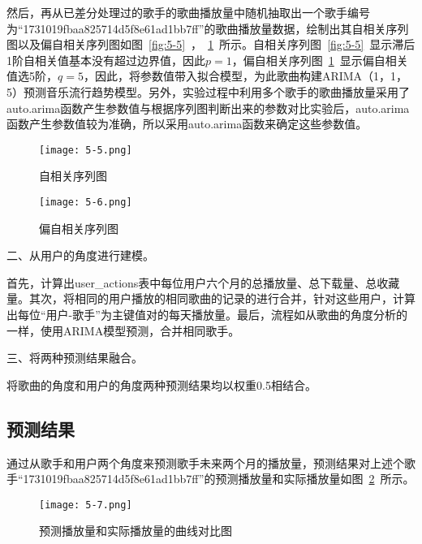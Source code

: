 然后，再从已差分处理过的歌手的歌曲播放量中随机抽取出一个歌手编号为“1731019fbaa825714d5f8e61ad1bb7ff”的歌曲播放量数据，绘制出其自相关序列图以及偏自相关序列图如图~\ref{fig:5-5}~，~\ref{fig:5-6}~所示。自相关序列图~\ref{fig:5-5}~显示滞后1阶自相关值基本没有超过边界值，因此$p=1 $，偏自相关序列图~\ref{fig:5-6}~显示偏自相关值选5阶，$q=5 $，因此，将参数值带入拟合模型，为此歌曲构建ARIMA（1，1，5）预测音乐流行趋势模型。另外，实验过程中利用多个歌手的歌曲播放量采用了auto.arima函数产生参数值与根据序列图判断出来的参数对比实验后，auto.arima函数产生参数值较为准确，所以采用auto.arima函数来确定这些参数值。
\begin{figure}[htbp]
    \centering
    \begin{minipage}[t]{0.4\textwidth}
    \centering
    \texttt{[image: 5-5.png]}
    \caption{自相关序列图}
    \label{fig:5-5}
    \end{minipage}
    \centering
    \begin{minipage}[t]{0.4\textwidth}
    \centering
    \texttt{[image: 5-6.png]}
    \caption{偏自相关序列图}
    \label{fig:5-6}
    \end{minipage}
    \end{figure}

二、从用户的角度进行建模。

首先，计算出user\_actions表中每位用户六个月的总播放量、总下载量、总收藏量。其次，将相同的用户播放的相同歌曲的记录的进行合并，针对这些用户，计算出每位“用户-歌手”为主键值对的每天播放量。最后，流程如从歌曲的角度分析的一样，使用ARIMA模型预测，合并相同歌手。

三、将两种预测结果融合。

将歌曲的角度和用户的角度两种预测结果均以权重0.5相结合。

\subsection{预测结果}
通过从歌手和用户两个角度来预测歌手未来两个月的播放量，预测结果对上述个歌手“1731019fbaa825714d5f8e61ad1bb7ff”的预测播放量和实际播放量如图~\ref{fig:5-7}~所示。
\begin{figure}[htb]
    \centering
\texttt{[image: 5-7.png]}
\caption{预测播放量和实际播放量的曲线对比图}
\label{fig:5-7}
\end{figure}

